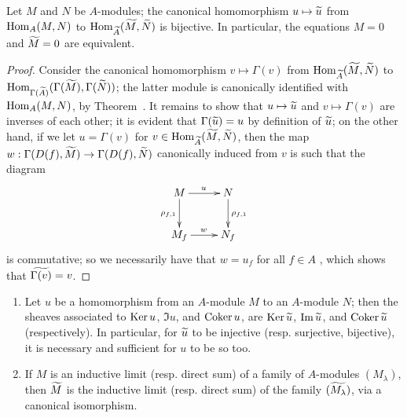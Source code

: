 \begin{cor}[1.3.8]
\label{1.1.3.8}
Let $M$ and $N$ be $A$-modules;
the canonical homomorphism $u\mapsto\wt{u}$ from ${\mathop{\mathrm{Hom}}\nolimits}_A(M,N)$ to ${\mathop{\mathrm{Hom}}\nolimits}_{\widetilde{A}}({\widetilde{M}},{\widetilde{N}})$ is bijective.
In particular, the equations $M=0$ and ${\widetilde{M}}=0$ are equivalent.
\end{cor}

\begin{proof}
\label{proof-1.1.3.8}
Consider the canonical homomorphism $v\mapsto\Gamma(v)$ from ${\mathop{\mathrm{Hom}}\nolimits}_{\widetilde{A}}({\widetilde{M}},{\widetilde{N}})$ to ${\mathop{\mathrm{Hom}}\nolimits}_{\Gamma({\widetilde{A}})}(\Gamma({\widetilde{M}}),\Gamma({\widetilde{N}}))$;
the latter module is canonically identified with ${\mathop{\mathrm{Hom}}\nolimits}_A(M,N)$, by Theorem~.
It remains to show that $u\mapsto\wt{u}$ and $v\mapsto\Gamma(v)$ are inverses of each other;
it is evident that $\Gamma({\widetilde{u}})=u$ by definition of ${\widetilde{u}}$;
on the other hand, if we let $u=\Gamma(v)$ for $v\in{\mathop{\mathrm{Hom}}\nolimits}_{\widetilde{A}}({\widetilde{M}},{\widetilde{N}})$, then the map $w:\Gamma(D(f),\wt{M})\to\Gamma(D(f),\wt{N})$ canonically induced from $v$ is such that the diagram
\[
  \xymatrix{
    M\ar[r]^u\ar[d]_{\rho_{f,1}} & N\ar[d]^{\rho_{f,1}}\\
    M_f\ar[r]^w & N_f
  }
\]
is commutative;
so we necessarily have that $w=u_f$ for all $f\in A$ , which shows that ${\widetilde{\Gamma(v)}}=v$.
\end{proof}

\begin{cor}[1.3.9]
\label{1.1.3.9}
\medskip\noindent
\begin{enumerate}[label=\emph{(\roman*)}]
  \item Let $u$ be a homomorphism from an $A$-module $M$ to an $A$-module $N$;
    then the sheaves associated to ${\mathop{\mathrm{Ker}}\nolimits}\, u$, $\Im u$, and ${\mathop{\mathrm{Coker}}\nolimits}\, u$, are ${\mathop{\mathrm{Ker}}\nolimits}\,{\widetilde{u}}$, ${\mathop{\mathrm{Im}}\nolimits}\,{\widetilde{u}}$, and ${\mathop{\mathrm{Coker}}\nolimits}\,{\widetilde{u}}$ (respectively).
    In particular, for ${\widetilde{u}}$ to be injective (resp. surjective, bijective), it is necessary and sufficient for $u$ to be so too.
  \item If $M$ is an inductive limit (resp. direct sum) of a family of $A$-modules $(M_\lambda)$, then ${\widetilde{M}}$ is the inductive limit (resp. direct sum) of the family $({\widetilde{M_\lambda}})$, via a canonical isomorphism.
\end{enumerate}
\end{cor}

